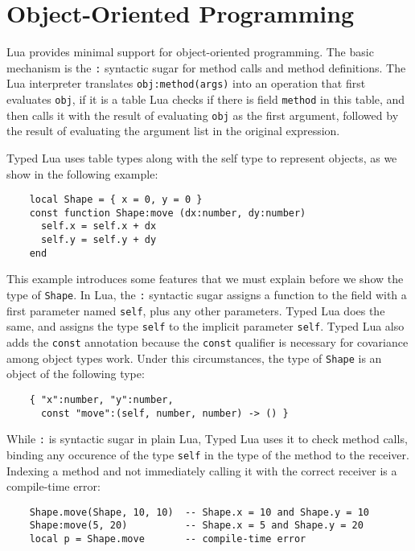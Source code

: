 \section{Object-Oriented Programming}

Lua provides minimal support for object-oriented programming.
The basic mechanism is the \texttt{:} syntactic sugar for method
calls and method definitions.
The Lua interpreter translates \texttt{obj:method(args)} into
an operation that first evaluates \texttt{obj}, if it is a table
Lua checks if there is field \texttt{method} in this table,
and then calls it with the result of evaluating \texttt{obj} as
the first argument, followed by the result of evaluating the
argument list in the original expression.

Typed Lua uses table types along with the self type to
represent objects, as we show in the following example:
\begin{verbatim}
    local Shape = { x = 0, y = 0 }
    const function Shape:move (dx:number, dy:number)
      self.x = self.x + dx
      self.y = self.y + dy
    end
\end{verbatim}

This example introduces some features that we must explain
before we show the type of \texttt{Shape}.
In Lua, the \texttt{:} syntactic sugar assigns a function to the
field with a first parameter named \texttt{self}, plus any other
parameters.
Typed Lua does the same, and assigns the type \texttt{self} to the
implicit parameter \texttt{self}.
Typed Lua also adds the \texttt{const} annotation because the
\texttt{const} qualifier is necessary for covariance among object types work.
Under this circumstances, the type of \texttt{Shape} is an object of
the following type:
\begin{verbatim}
    { "x":number, "y":number,
      const "move":(self, number, number) -> () }
\end{verbatim}

While \texttt{:} is syntactic sugar in plain Lua, Typed Lua uses it
to check method calls, binding any occurence of the type \texttt{self}
in the type of the method to the receiver.
Indexing a method and not immediately calling it with the correct
receiver is a compile-time error:
\begin{verbatim}
    Shape.move(Shape, 10, 10)  -- Shape.x = 10 and Shape.y = 10
    Shape:move(5, 20)          -- Shape.x = 5 and Shape.y = 20
    local p = Shape.move       -- compile-time error
\end{verbatim}


